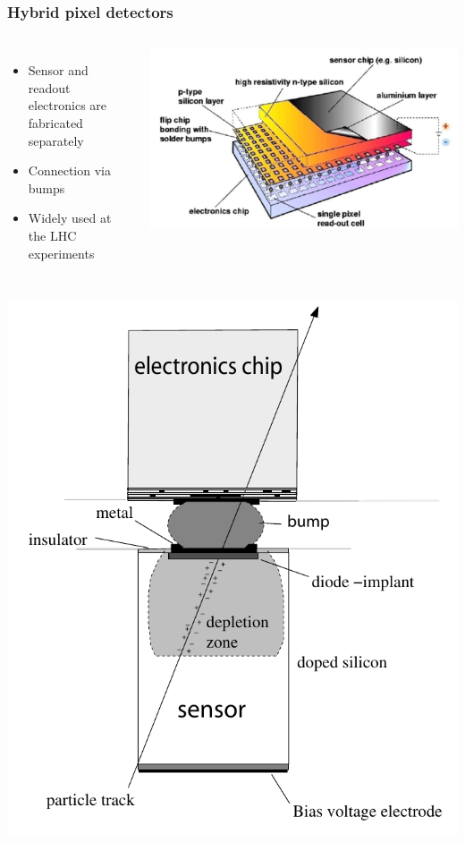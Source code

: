 \begin{frame}
  \frametitle{Hybrid pixel detectors}

  \begin{columns}
    \begin{itemize}
    \item Sensor and readout electronics are fabricated separately
    \item Connection via bumps 
    \item Widely used at the LHC experiments
    \end{itemize}
    \centering
    \includegraphics[width=\textwidth]{figures/hybrid_detector.png}
  \end{columns}

  \begin{columns}
    \centering
    \includegraphics[width=\textwidth]{figures/siliconSensorPrinciple.pdf}


\end{columns}
\end{frame}

